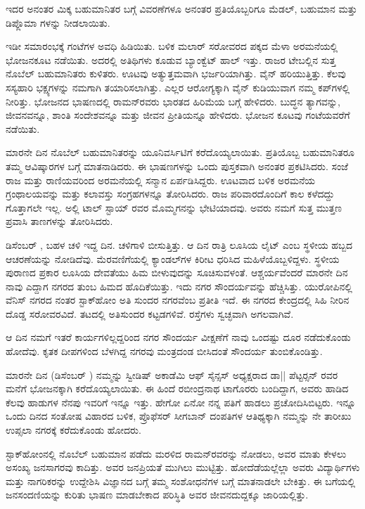 ಇದರ ಅನಂತರ ಮಿಕ್ಕ ಬಹುಮಾನಿತರ ಬಗ್ಗೆ ವಿವರಣೆಗಳೂ ಅನಂತರ ಪ್ರತಿಯೊಬ್ಬರಿಗೂ ಮೆಡಲ್, ಬಹುಮಾನ ಮತ್ತು ಡಿಪ್ಲೊಮಾ ಗಳನ್ನು ನೀಡಲಾಯಿತು.

ಇಡೀ ಸಮಾರಂಭಕ್ಕೆ  ಗಂಟೆಗಳ ಅವಧಿ ಹಿಡಿಯಿತು. ಬಳಿಕ ಮಲಾರ್ ಸರೋವರದ ಪಕ್ಕದ ಮೆಳಾ ಅರಮನೆಯಲ್ಲಿ ಭೋಜನಕೂಟ ನಡೆಯಿತು. ಅದರಲ್ಲಿ  ಅತಿಥಿಗಳು ಕೂಡುವ ಬ್ಯಾಂಕ್ವೆಟ್ ಹಾಲ್ ಇತ್ತು. ರಾಜರ ಟೇಬಲ್ಲಿನ ಸುತ್ತ ನೊಬೆಲ್ ಬಹುಮಾನಿತರು ಕುಳಿತರು. ಊಟವು ಅತ್ಯುತ್ತಮವಾಗಿ ಭರ್ಜರಿಯಾಗಿತ್ತು. ವೈನ್ ಹರಿಯುತ್ತಿತ್ತು. ಕೆಲವು ಸಸ್ಯಹಾರಿ ಭಕ್ಷ್ಯಗಳನ್ನು ನಮಗಾಗಿ ತಯಾರಿಸಲಾಗಿತ್ತು. ಎಲ್ಲರ ಆರೋಗ್ಯಕ್ಕಾಗಿ ವೈನ್ ಕುಡಿಯುವಾಗ ನಮ್ಮ ಕಪ್‍ಗಳಲ್ಲಿ ನೀರಿತ್ತು. ಭೋಜನದ ಭಾಷಣದಲ್ಲಿ ರಾಮನ್‍ರವರು ಭಾರತದ ಹಿರಿಮೆಯ ಬಗ್ಗೆ ಹೇಳಿದರು. ಬುದ್ಧನ ತ್ಯಾಗವನ್ನು, ಜೀವನವನ್ನೂ, ಶಾಂತಿ ಸಂದೇಶವನ್ನೂ ಮತ್ತು ಜೀವನ ಪ್ರೀತಿಯನ್ನೂ ಹೇಳಿದರು. ಭೋಜನ ಕೂಟವು  ಗಂಟೆಯವರೆಗೆ ನಡೆಯಿತು.

ಮಾರನೇ ದಿನ ನೊಬೆಲ್ ಬಹುಮಾನಿತರನ್ನು ಯೂನಿವರ್ಸಿಟಿಗೆ ಕರೆದೊಯ್ಯಲಾಯಿತು. ಪ್ರತಿಯೊಬ್ಬ ಬಹುಮಾನಿತರೂ ತಮ್ಮ ಆವಿಷ್ಕಾರಗಳ ಬಗ್ಗೆ ಮಾತನಾಡಿದರು. ಈ ಭಾಷಣಗಳನ್ನು ಒಂದು ಪುಸ್ತಕವಾಗಿ ಅನಂತರ ಪ್ರಕಟಿಸಿದರು. ಸಂಜೆ ರಾಜ ಮತ್ತು ರಾಣಿಯವರಿಂದ ಅರಮನೆಯಲ್ಲಿ ಸನ್ಮಾನ ಏರ್ಪಡಿಸಿದ್ದರು. ಊಟವಾದ ಬಳಿಕ ಅರಮನೆಯ ಗ್ರಂಥಾಲಯವನ್ನು ಮತ್ತು ಕಲಾವಸ್ತು ಸಂಗ್ರಹಗಳನ್ನೂ ತೋರಿಸಿದರು. ರಾಜ ಪರಿವಾರದೊಂದಿಗೆ ಕಾಲ ಕಳೆದದ್ದು ಗೊತ್ತಾಗಲೇ ಇಲ್ಲ. ಅಲ್ಲಿ ಟಾಲ್ ಸ್ಟಾಯ್ ರವರ ಮೊಮ್ಮಗನನ್ನು ಭೇಟಿಯಾದವು. ಅವರು ನಮಗೆ ಸುತ್ತ ಮುತ್ತಣ ಪ್ರವಾಸಿ ತಾಣಗಳನ್ನು ತೋರಿಸಿದರು.

ಡಿಸೆಂಬರ್ , ಬಹಳ ಚಳಿ ಇದ್ದ ದಿನ. ಚಳಿಗಾಳಿ ಬೀಸುತ್ತಿತ್ತು. ಆ ದಿನ ರಾತ್ರಿ ಲೂಸಿಯ ಲೈಟ್ ಎಂಬ ಸ್ಥಳೀಯ ಹಬ್ಬದ ಆಚರಣೆಯನ್ನು ನೋಡಿದೆವು. ಮೆರವಣಿಗೆಯಲ್ಲಿ ಕ್ಯಾಂಡಲ್‍ಗಳ ಕಿರೀಟ ಧರಿಸಿದ ಮಹಿಳೆಯೊಬ್ಬಳಿದ್ದಳು. ಸ್ಥಳೀಯ ಪುರಾಣದ ಪ್ರಕಾರ ಲೂಸಿಯ ದೇವತೆಯು ಹಿಮ ಬೀಳುವುದನ್ನು ಸೂಚಿಸುವಳಂತೆ. ಆಶ್ಚರ್ಯವೆಂದರೆ ಮಾರನೇ ದಿನ ನಾವು ಎದ್ದಾಗ ನಗರದ ತುಂಬ ಹಿಮದ ಹೊದಿಕೆಯಿತ್ತು. ಇದು ನಗರ ಸೌಂದರ್ಯವನ್ನು ಹೆಚ್ಚಿಸಿತ್ತು. ಯುರೋಪಿನಲ್ಲಿ ವೆನಿಸ್ ನಗರದ ನಂತರ ಸ್ಟಾಕ್‍ಹೋಂ ಅತಿ ಸುಂದರ ನಗರವೆಂಬ ಪ್ರತೀತಿ ಇದೆ. ಈ ನಗರದ ಕೇಂದ್ರದಲ್ಲಿ ಸಿಹಿ ನೀರಿನ ದೊಡ್ಡ ಸರೋವರವಿದೆ. ತಟದಲ್ಲಿ ಅತಿಸುಂದರ ಕಟ್ಟಡಗಳಿವೆ. ರಸ್ತೆಗಳು ಸ್ವಚ್ಛವಾಗಿ ಅಗಲವಾಗಿವೆ.

ಆ ದಿನ ನಮಗೆ ಇತರೆ ಕಾರ್ಯಗಳಿಲ್ಲದ್ದರಿಂದ ನಗರ ಸೌಂದರ್ಯ ವೀಕ್ಷಣೆಗೆ ನಾವು ಒಂದಷ್ಟು ದೂರ ನಡೆದುಕೊಂಡು ಹೋದೆವು. ಕೃತಕ ದೀಪಗಳಿಂದ ಬೆಳಗಿದ್ದ ನಗರವು ಮಂತ್ರದಂಡ ಬೀಸಿದಂತೆ ಸೌಂದರ್ಯ ತುಂಬಿಕೊಂಡಿತ್ತು.

ಮಾರನೇ ದಿನ (ಡಿಸೆಂಬರ್ ) ನಮ್ಮನ್ನು ಸ್ವೀಡಿಷ್ ಅಕಾಡೆಮಿ ಆಫ್ ಸೈನ್ಸಸ್ ಅಧ್ಯಕ್ಷರಾದ ಡಾ|| ಪೆಟ್ಟರ್‍ಸನ್ ರವರ ಮನೆಗೆ ಭೋಜನಕ್ಕಾಗಿ ಕರೆದೊಯ್ಯಲಾಯಿತು. ಈ ಹಿಂದೆ ರಬೀಂದ್ರನಾಥ ಟಾಗೊರರು ಬಂದಿದ್ದಾಗ, ಅವರು ಹಾಡಿದ ಕೆಲವು ಹಾಡುಗಳ ನೆನಪು ಇವರಿಗೆ ಇನ್ನೂ ಇತ್ತು. ಹೇಗೋ ಏನೋ ನನ್ನ ಪತಿಗೆ ಹಾಡಲು ಪ್ರಚೋದಿಸಿಬಿಟ್ಟರು. ಇನ್ನೂ ಒಂದು ದಿನದ ಸಂತೋಷ ವಿಹಾರದ ಬಳಿಕ, ಪ್ರೊಫೆಸರ್ ಸೀಗಬಾನ್ ದಂಪತಿಗಳ ಆತಿಥ್ಯಕ್ಕಾಗಿ ನಮ್ಮನ್ನು ನೇ ತಾರೀಖು ಉಪ್ಸಲಾ ನಗರಕ್ಕೆ ಕರೆದುಕೊಂಡು ಹೋದರು.

ಸ್ಟಾಕ್‍ಹೋಂನಲ್ಲಿ ನೊಬೆಲ್ ಬಹುಮಾನ ಪಡೆದು ಮರಳಿದ ರಾಮನ್‍ರವರನ್ನು ನೋಡಲು, ಅವರ ಮಾತು ಕೇಳಲು ಅಸಂಖ್ಯ ಜನಸಾಗರವು ಕಾದಿತ್ತು. ಅವರ ಜನಪ್ರಿಯತೆ ಮುಗಿಲು ಮುಟ್ಟಿತ್ತು. ಹೋದೆಡೆಯಲ್ಲೆಲ್ಲಾ ಅವರು ವಿದ್ಯಾರ್ಥಿಗಳು ಮತ್ತು ನಾಗರಿಕರನ್ನು ಉದ್ದೇಶಿಸಿ ವಿಜ್ಞಾನದ ಬಗ್ಗೆ ತಮ್ಮ ಸಂಶೋಧನೆಗಳ ಬಗ್ಗೆ ಮಾತನಾಡಲೇ ಬೇಕಿತ್ತು. ಈ ಬಗೆಯಲ್ಲಿ ಜನಸಂದಣಿಯನ್ನು ಕುರಿತು ಭಾಷಣ ಮಾಡಬೇಕಾದ ಪರಿಸ್ಥಿತಿ ಅವರ ಜೀವನದುದ್ದಕ್ಕೂ ಜಾರಿಯಲ್ಲಿತ್ತು.

